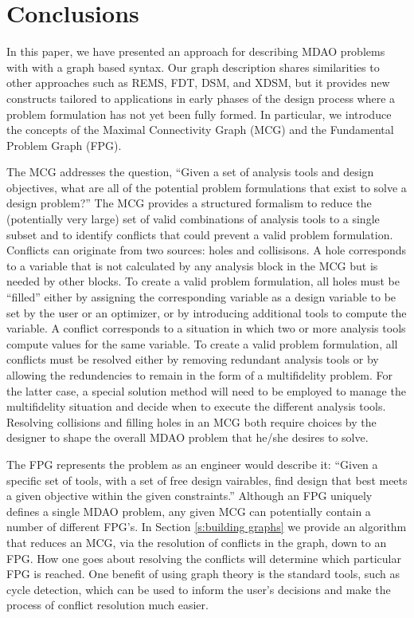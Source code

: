 \section*{Conclusions}
In this paper, we have presented an approach for describing  MDAO problems with 
with a graph based syntax.  Our graph description shares 
similarities to other approaches such as REMS, FDT, DSM, and XDSM, but 
it provides new constructs tailored to applications in early phases of the design 
process where a problem formulation has not yet been fully formed.   
In particular, we introduce the concepts of the Maximal Connectivity Graph (MCG) 
and the Fundamental Problem Graph (FPG).  

The MCG addresses the question, ``Given a set of analysis tools and design objectives, what are all 
of the potential problem formulations that exist to solve a design problem?''  
The MCG provides a structured formalism to reduce the (potentially very large) 
set of valid combinations of analysis tools to a single subset and to identify
conflicts that could prevent a valid problem formulation.
Conflicts can originate from two sources: holes and collisisons. A hole 
corresponds to a variable that is not calculated by any analysis block in the 
MCG but is needed by other blocks. To create a valid problem formulation, all 
holes must be ``filled'' either by assigning the corresponding variable as a 
design variable to be set by the user or an optimizer, or by introducing 
additional tools to compute the variable.  A conflict corresponds to a 
situation in which two or more analysis tools compute values for the same variable.  
To create a valid problem formulation, all conflicts must be resolved either by 
removing redundant analysis tools or by allowing the redundencies to remain 
in the form of a multifidelity problem. For the latter case, a special solution 
method will need to be employed to manage the multifidelity situation and decide 
when to execute the different analysis tools. Resolving collisions and filling 
holes in an MCG both require choices by the designer to shape the overall
MDAO problem that he/she desires to solve. 

The FPG represents the problem as an engineer would describe it: ``Given a specific set of tools, 
with a set of free design vairables, find design that best meets a given objective
within the given constraints.'' Although an FPG uniquely defines a single MDAO problem, 
any given MCG can potentially contain a number of different FPG's. In Section 
\ref{s:building graphs} we provide an algorithm 
that reduces an MCG, via the resolution of conflicts in the graph, down to an FPG. 
How one goes about resolving the conflicts will determine which particular FPG is reached. 
One benefit of using graph theory is the standard tools, such as cycle 
detection, which can be used to inform the user's decisions and make the process of conflict 
resolution much easier. 

